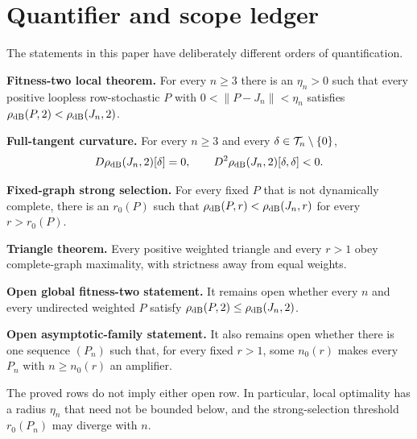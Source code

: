 \section{Quantifier and scope ledger}\label{app:quantifiers}

The statements in this paper have deliberately different orders of
quantification.

\medskip
\noindent\textbf{Fitness-two local theorem.}
For every $n\ge3$ there is an $\eta_n>0$ such that every positive loopless
row-stochastic $P$ with $0<\|P-J_n\|<\eta_n$ satisfies
$\rho_{\mathrm{dB}}(P,2)<\rho_{\mathrm{dB}}(J_n,2)$.

\medskip
\noindent\textbf{Full-tangent curvature.}
For every $n\ge3$ and every $\delta\in\mathcal T_n\setminus\{0\}$,
\[
 D\rho_{\mathrm{dB}}(J_n,2)[\delta]=0,\qquad
 D^2\rho_{\mathrm{dB}}(J_n,2)[\delta,\delta]<0.
\]

\medskip
\noindent\textbf{Fixed-graph strong selection.}
For every fixed $P$ that is not dynamically complete, there is an $r_0(P)$
such that $\rho_{\mathrm{dB}}(P,r)<\rho_{\mathrm{dB}}(J_n,r)$ for every $r>r_0(P)$.

\medskip
\noindent\textbf{Triangle theorem.}
Every positive weighted triangle and every $r>1$ obey complete-graph
maximality, with strictness away from equal weights.

\medskip
\noindent\textbf{Open global fitness-two statement.}
It remains open whether every $n$ and every undirected weighted $P$ satisfy
$\rho_{\mathrm{dB}}(P,2)\le\rho_{\mathrm{dB}}(J_n,2)$.

\medskip
\noindent\textbf{Open asymptotic-family statement.}
It also remains open whether there is one sequence $(P_n)$ such that, for
every fixed $r>1$, some $n_0(r)$ makes every $P_n$ with $n\ge n_0(r)$ an
amplifier.

The proved rows do not imply either open row.  In particular, local
optimality has a radius $\eta_n$ that need not be bounded below, and the strong-selection threshold
$r_0(P_n)$ may diverge with $n$.
